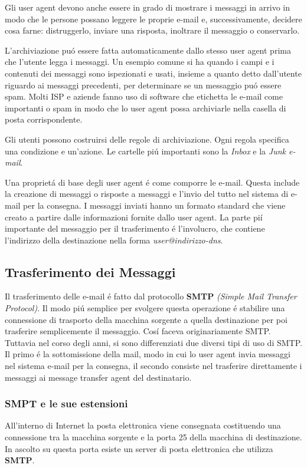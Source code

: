 \documentclass[12pt]{article}
\begin{document}
Gli user agent devono anche essere in grado di mostrare i messaggi in arrivo in modo che le persone possano leggere le proprie e-mail 
e, successivamente, decidere cosa farne: distruggerlo, inviare una risposta, inoltrare il messaggio o conservarlo.

L'archiviazione pu\'o essere fatta automaticamente dallo stesso user agent prima che l'utente legga i messaggi. Un esempio comune si 
ha quando i campi e i contenuti dei messaggi sono ispezionati e usati, insieme a quanto detto dall'utente riguardo ai messaggi 
precedenti, per determinare se un messaggio pu\'o essere spam. Molti ISP e aziende fanno uso di software che etichetta le e-mail come 
importanti o spam in modo che lo user agent possa archiviarle nella casella di posta corrispondente.

Gli utenti possono costruirsi delle regole di archiviazione. Ogni regola specifica una condizione e un'azione. Le cartelle pi\'u 
importanti sono la \textit{Inbox} e la \textit{Junk e-mail}.

Una propriet\'a di base degli user agent \'e come comporre le e-mail. Questa include la creazione di messaggi o risposte a messaggi e 
l'invio del tutto nel sistema di e-mail per la consegna. I messaggi inviati hanno un formato standard che viene creato a partire 
dalle informazioni fornite dallo user agent. La parte pi\'i importante del messaggio per il trasferimento \'e l'involucro, che 
contiene l'indirizzo della destinazione nella forma \textit{user@indirizzo-dns}.

\subsection{Trasferimento dei Messaggi}\label{posta-elettronica-trasferimento-dei-messaggi}
Il trasferimento delle e-mail \'e fatto dal protocollo \textbf{SMTP} \textit{(Simple Mail Transfer Protocol)}. Il modo pi\'u semplice 
per svolgere questa operazione \'e stabilire una connessione di trasporto della macchina sorgente a quella destinazione per poi 
trasferire semplicemente il messaggio. Cos\'i faceva originariamente SMTP. Tuttavia nel corso degli anni, si sono differenziati due 
diversi tipi di uso di SMTP. Il primo \'e la sottomissione della mail, modo in cui lo user agent invia messaggi nel sistema e-mail 
per la consegna, il secondo consiste nel trasferire direttamente i messaggi ai message transfer agent del destinatario.

\subsubsection{SMPT e le sue estensioni}\label{posta-elettronica-smtp-ed-estensioni}
All'interno di Internet la posta elettronica viene consegnata costituendo una connessione tra la macchina sorgente e la porta 25 
della macchina di destinazione. In ascolto su questa porta esiste un server di posta elettronica che utilizza \textbf{SMTP}.
\end{document}
